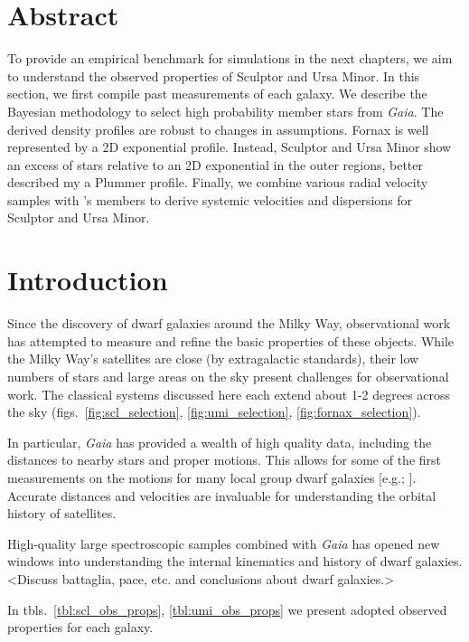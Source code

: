 \section{Abstract}\label{abstract}

To provide an empirical benchmark for simulations in the next chapters,
we aim to understand the observed properties of Sculptor and Ursa Minor.
In this section, we first compile past measurements of each galaxy. We
describe the \citet{jensen+2024} Bayesian methodology to select high
probability member stars from \emph{Gaia}. The derived density profiles
are robust to changes in assumptions. Fornax is well represented by a 2D
exponential profile. Instead, Sculptor and Ursa Minor show an excess of
stars relative to an 2D exponential in the outer regions, better
described my a Plummer profile. Finally, we combine various radial
velocity samples with \citet{jensen+2024}'s members to derive systemic
velocities and dispersions for Sculptor and Ursa Minor.

\section{Introduction}\label{introduction}

Since the discovery of dwarf galaxies around the Milky Way,
observational work has attempted to measure and refine the basic
properties of these objects. While the Milky Way's satellites are close
(by extragalactic standards), their low numbers of stars and large areas
on the sky present challenges for observational work. The classical
systems discussed here each extend about 1-2 degrees across the sky
(figs.~\ref{fig:scl_selection}, \ref{fig:umi_selection}, \ref{fig:fornax_selection}).

In particular, \emph{Gaia} has provided a wealth of high quality data,
including the distances to nearby stars and proper motions. This allows
for some of the first measurements on the motions for many local group
dwarf galaxies {[}e.g.; \citet{MV2020}{]}. Accurate distances and
velocities are invaluable for understanding the orbital history of
satellites.

High-quality large spectroscopic samples combined with \emph{Gaia} has
opened new windows into understanding the internal kinematics and
history of dwarf galaxies. \textless Discuss battaglia, pace, etc. and
conclusions about dwarf galaxies.\textgreater{}

In tbls.~\ref{tbl:scl_obs_props}, \ref{tbl:umi_obs_props} we present
adopted observed properties for each galaxy.


